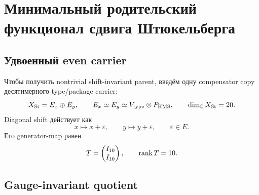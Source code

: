\chapter{Минимальный родительский функционал сдвига Штюкельберга}
\label{ch:v9-kms-minimal-stueckelberg}

\section{Удвоенный even carrier}

Чтобы получить nontrivial shift-invariant parent, введём одну compensator
copy десятимерного type/package carrier:
\begin{equation}
 X_{\rm St}=E_x\oplus E_y,
 \qquad
 E_x\simeq E_y\simeq V_{\rm type}\otimes P_{\rm KMS},
 \qquad \dim_{\mathbb C}X_{\rm St}=20.
 \label{eq:v9-kms-stueckelberg-carrier}
\end{equation}
Diagonal shift действует как
\begin{equation}
 x\longmapsto x+\varepsilon,
 \qquad
 y\longmapsto y+\varepsilon,
 \qquad \varepsilon\in E.
 \label{eq:v9-kms-stueckelberg-shift}
\end{equation}
Его generator-map равен
\begin{equation}
 T=\begin{pmatrix}I_{10}\\I_{10}\end{pmatrix},
 \qquad \operatorname{rank} T=10.
 \label{eq:v9-kms-stueckelberg-orbit-map}
\end{equation}

\section{Gauge-invariant quotient}

